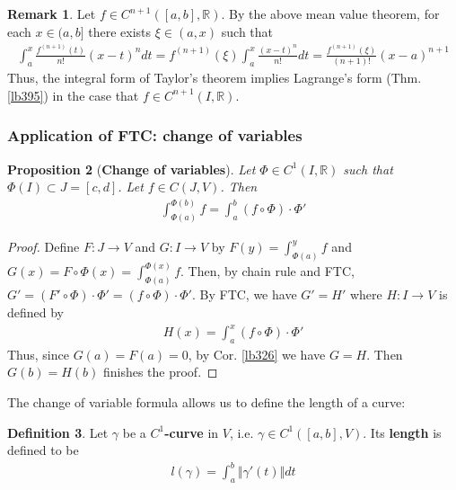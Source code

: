 \documentclass[12pt,b5paper,notitlepage]{article}
\theoremstyle{definition}
\newtheorem{df}{Definition}[section]
\newtheorem{rem}[df]{Remark}
\theoremstyle{plain}
\newtheorem{pp}[df]{Proposition}
\newcommand{\Rbb}{\mathbb R}
\newcommand{\dps}{\displaystyle}
\numberwithin{equation}{section}
\begin{document}
\begin{rem}
Let $f\in C^{n+1}([a,b],\Rbb)$. By the above mean value theorem, for each $x\in(a,b]$ there exists $\xi\in(a,x)$ such that
\begin{align*}
\int_a^x\frac{f^{(n+1)}(t)}{n!}(x-t)^ndt=f^{(n+1)}(\xi)\int_a^x\frac{(x-t)^n}{n!}dt=\frac{f^{(n+1)}(\xi)}{(n+1)!}(x-a)^{n+1}
\end{align*}
Thus, the integral form of Taylor's theorem implies Lagrange's form (Thm. \ref{lb395}) in the case that $f\in C^{n+1}(I,\Rbb)$.
\end{rem}


\subsubsection{Application of FTC: change of variables}



\begin{pp}[\textbf{Change of variables}]\label{lb396}
Let $\Phi\in C^1(I,\Rbb)$ such that $\Phi(I)\subset J=[c,d]$. Let $f\in C(J,V)$. Then
\begin{align}
\int_{\Phi(a)}^{\Phi(b)} f=\int_a^b(f\circ\Phi)\cdot\Phi'
\end{align}
\end{pp}

\begin{proof}
Define $F:J\rightarrow V$ and $G:I\rightarrow V$ by $\dps F(y)=\int_{\Phi(a)}^y f$ and $\dps G(x)=F\circ\Phi(x)=\int_{\Phi(a)}^{\Phi(x)}f$. Then, by chain rule and FTC, $G'=(F'\circ\Phi)\cdot\Phi'=(f\circ\Phi)\cdot\Phi'$. By FTC, we have $G'=H'$ where $H:I\rightarrow V$ is defined by
\begin{align*}
H(x)=\int_a^x (f\circ\Phi)\cdot\Phi'
\end{align*}
Thus, since $G(a)=F(a)=0$, by Cor. \ref{lb326} we have $G=H$. Then $G(b)=H(b)$ finishes the proof.
\end{proof}



The change of variable formula allows us to define the length of a curve:


\begin{df}
Let $\gamma$ be a \textbf{$C^1$-curve} in $V$, i.e. $\gamma\in C^1([a,b],V)$. Its \textbf{length}  is defined to be
\begin{align*}
l(\gamma)=\int_a^b\Vert \gamma'(t)\Vert dt
\end{align*}
\end{df}
\end{document}
